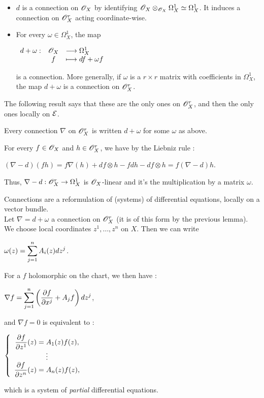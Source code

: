 \begin{myex}
\begin{itemize}
\item[1)] $d$ is a connection on $\mathscr{O}_X$ by identifying $\mathscr{O}_X \otimes_{\mathscr{O}_X} \Omega_X^1 \simeq \Omega_X^1$. It induces a connection on $\mathscr{O}_X^r$ acting coordinate-wise.
\item[2)] For every $\omega \in\Omega_X^1$, the map
\begin{center}
$\displaystyle \begin{array}{rcll} d+\omega : & \mathscr{O}_X & \longrightarrow \Omega_X^1 \\ & f & \longmapsto df +\omega f \end{array}$
\end{center}
is a connection. More generally, if $\omega$ is a $r \times r$ matrix with coefficients in $\Omega_X^1$, the map $d + \omega$ is a connection on $\mathscr{O}_X^r$.
\end{itemize}
\end{myex}

The following result says that these are the only ones on $\mathscr{O}_X^r$, and then the only ones locally on $\mathcal{E}$.

\begin{mylemme}
Every connection $\nabla$ on $\mathscr{O}_X^r$ is written $d + \omega$ for some $\omega$ as above.
\end{mylemme}

\begin{mydemo}
For every $f \in \mathscr{O}_X$ and $h \in \mathscr{O}_X^r$, we have by the Liebniz rule :
\begin{center}
$(\nabla - d)(fh) = f\nabla(h) + df \otimes h - fdh - df \otimes h = f(\nabla - d)h$.
\end{center}
Thus, $\nabla - d : \mathscr{O}_X^r \to \Omega_X^1$ is $\mathscr{O}_X$-linear and it's the multiplication by a matrix $\omega$.
\end{mydemo}

\begin{myrem} \label{connections_diff_eq}
Connections are a reformulation of (systems) of differential equations, locally on a vector bundle.\\
Let $\nabla = d + \omega$ a connection on $\mathscr{O}_X^r$ (it is of this form by the previous lemma). We choose local coordinates $z^1,\dots,z^n$ on $X$. Then we can write 
\begin{center}
$\displaystyle \omega(z) = \sum_{j=1}^n A_i(z) dz^j$.
\end{center}
For a $f$ holomorphic on the chart, we then have :
\begin{center}
$\displaystyle \nabla f = \sum_{j=1}^n \left(\frac{\partial f}{\partial x^j} + A_j f\right)dz^j$,
\end{center}
and $\nabla f = 0$ is equivalent to :
\begin{center}
$\left\lbrace
\begin{array}{c}
\displaystyle \frac{\partial f}{\partial z^1}(z) = A_1(z) f(z),\\
\displaystyle \vdots \\
\displaystyle\frac{\partial f}{\partial z^n}(z) = A_n(z) f(z),
\end{array}
\right.$
\end{center}
which is a system of \textit{partial} differential equations.\\
\end{myrem}

